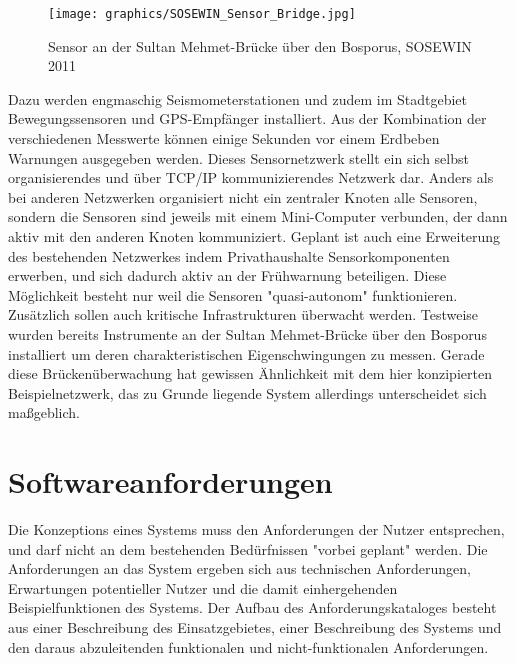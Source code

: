 \begin{figure}
  \begin{center}
 	 \texttt{[image: graphics/SOSEWIN\_Sensor\_Bridge.jpg]} 
	\caption{Sensor an der Sultan Mehmet-Brücke über den Bosporus, SOSEWIN 2011}
  \end{center}
\end{figure}
Dazu werden engmaschig Seismometerstationen und zudem im Stadtgebiet Bewegungssensoren  und GPS-Empfänger installiert. Aus der Kombination der verschiedenen Messwerte können einige Sekunden vor einem Erdbeben Warnungen ausgegeben werden. Dieses Sensornetzwerk stellt ein sich selbst organisierendes und über TCP/IP kommunizierendes Netzwerk dar. Anders als bei anderen Netzwerken organisiert nicht ein zentraler Knoten alle Sensoren, sondern die Sensoren sind jeweils mit einem Mini-Computer verbunden, der dann aktiv mit den anderen Knoten kommuniziert. Geplant ist auch eine Erweiterung des bestehenden Netzwerkes indem Privathaushalte Sensorkomponenten erwerben, und sich dadurch aktiv an der Frühwarnung beteiligen. Diese Möglichkeit besteht nur weil die Sensoren "quasi-autonom" funktionieren. Zusätzlich sollen auch kritische Infrastrukturen überwacht werden. Testweise wurden bereits Instrumente an der Sultan Mehmet-Brücke über den Bosporus installiert um deren charakteristischen Eigenschwingungen zu messen. Gerade diese Brückenüberwachung hat gewissen Ähnlichkeit mit dem hier konzipierten Beispielnetzwerk, das zu Grunde liegende System allerdings unterscheidet sich maßgeblich. \citep{luhr_sekunden_2011}


\chapter{Softwareanforderungen}
Die Konzeptions eines Systems muss den Anforderungen der Nutzer entsprechen, und darf nicht an dem bestehenden Bedürfnissen "vorbei geplant" werden. Die Anforderungen an das System ergeben sich aus technischen Anforderungen, Erwartungen potentieller Nutzer und die damit einhergehenden Beispielfunktionen des Systems. Der Aufbau des Anforderungskataloges besteht aus einer Beschreibung des Einsatzgebietes, einer Beschreibung des Systems und den daraus abzuleitenden funktionalen und nicht-funktionalen Anforderungen.


